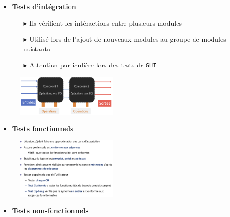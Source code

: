 \documentclass[16pt]{report}
\begin{document}
\begin{multicols*}{2}
       \begin{itemize}
        \item \textbf{Tests d'intégration}  
            \begin{itemize}
                \item[$\blacktriangleright$] Ils vérifient les intéractions entre plusieurs modules
                \item[$\blacktriangleright$] Utilisé lors de l'ajout de nouveaux modules au groupe de 
                    modules existants
                \item[$\blacktriangleright$] Attention particulière lors des tests de \texttt{GUI}                  
            \end{itemize}
       \end{itemize}



       \begin{figure}[H]
        \begin{center}
            \includegraphics[width=0.45\textwidth]{test2.png}
        \end{center}
       \end{figure}

       \begin{itemize}
        \item \textbf{Tests fonctionnels}  
       \end{itemize}



       \begin{figure}[H]
        \begin{center}
            \includegraphics[width=0.45\textwidth]{testfonc1.png}
        \end{center}
       \end{figure}
       
        \begin{itemize}
            \item \textbf{Tests non-fonctionnels}  
        \end{itemize}


\end{multicols*}
\end{document}
